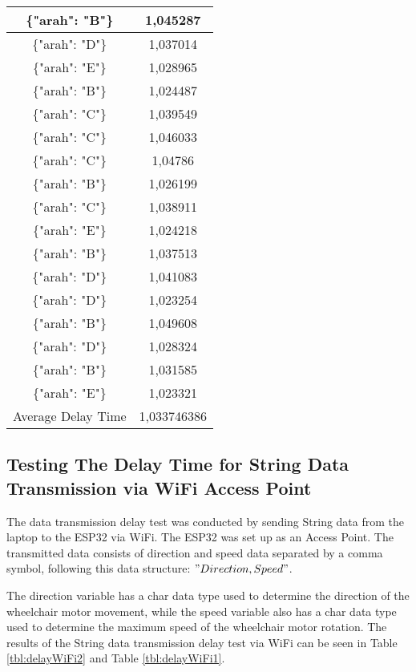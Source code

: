 \begin{table}[!ht]
\begin{tabular}{|c|c|}
  \{"arah": "B"\}    & 1,045287    \\ \hline
  \{"arah": "D"\}    & 1,037014    \\ \hline
  \{"arah": "E"\}    & 1,028965    \\ \hline
  \{"arah": "B"\}    & 1,024487    \\ \hline
  \{"arah": "C"\}    & 1,039549    \\ \hline
  \{"arah": "C"\}    & 1,046033    \\ \hline
  \{"arah": "C"\}    & 1,04786     \\ \hline
  \{"arah": "B"\}    & 1,026199    \\ \hline
  \{"arah": "C"\}    & 1,038911    \\ \hline
  \{"arah": "E"\}    & 1,024218    \\ \hline
  \{"arah": "B"\}    & 1,037513    \\ \hline
  \{"arah": "D"\}    & 1,041083    \\ \hline
  \{"arah": "D"\}    & 1,023254    \\ \hline
  \{"arah": "B"\}    & 1,049608    \\ \hline
  \{"arah": "D"\}    & 1,028324    \\ \hline
  \{"arah": "B"\}    & 1,031585    \\ \hline
  \{"arah": "E"\}    & 1,023321    \\ \hline
  Average Delay Time & 1,033746386 \\ \hline
  \end{tabular}
\end{table}

\newpage

\subsection{Testing The Delay Time for String Data Transmission via WiFi Access Point}

The data transmission delay test was conducted by sending String data from the laptop to the ESP32 via WiFi. The ESP32 was set up as an Access Point. The transmitted data consists of direction and speed data separated by a comma symbol, following this data structure: \("Direction, Speed"\).

The direction variable has a char data type used to determine the direction of the wheelchair motor movement, while the speed variable also has a char data type used to determine the maximum speed of the wheelchair motor rotation. The results of the String data transmission delay test via WiFi can be seen in Table \ref{tbl:delayWiFi2} and Table \ref{tbl:delayWiFi1}.

